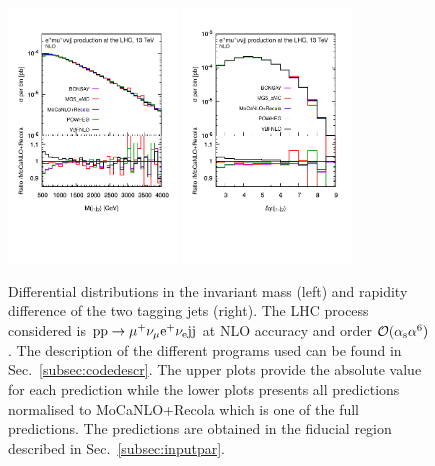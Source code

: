  \begin{figure}[hbt!]
   \centering
   \includegraphics[width=0.4\textwidth,angle=0,clip=true,trim={0.4cm 2cm 0.cm 1.cm}]{figures/NLO/mjj_NLO.pdf}
   \includegraphics[width=0.4\textwidth,angle=0,clip=true,trim={0.4cm 2cm 0.cm 1.cm}]{figures/NLO/dyj1j2_NLO.pdf}
\caption{\label{fig:distNLO1} Differential distributions in the invariant mass (left) and rapidity difference of the two tagging jets (right).
The LHC process considered is ${\rm p}{\rm p}\to\mu^+\nu_\mu{\rm e}^+\nu_{\rm e}{\rm j}{\rm j}$ at NLO accuracy and order $\mathcal{O}(\alpha_{\rm s}\alpha^6)$.
The description of the different programs used can be found in Sec.~\ref{subsec:codedescr}.
The upper plots provide the absolute value for each prediction while the lower plots presents all predictions normalised to {\sc MoCaNLO}+{\sc Recola} which is one of the full predictions.
The predictions are obtained in the fiducial region described in Sec.~\ref{subsec:inputpar}.
}
\end{figure}

